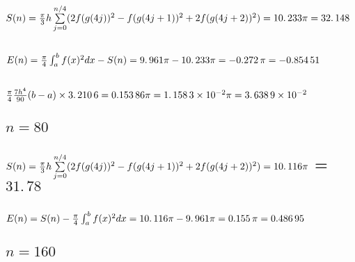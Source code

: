 \documentclass{article}
\begin{document}
\subsection{$S(n)=\frac{\protect\pi }{3}h\sum%
\limits_{j=0}^{n/4}(2f(g(4j))^{2}-f(g(4j+1))^{2}+2f(g(4j+2))^{2})=%
\allowbreak 10.\,\allowbreak 233\protect\pi =\allowbreak 32.\,\allowbreak
148 $}

\subsection{$E(n)=\frac{\protect\pi }{4}\protect\int_{a}^{b}f(x)^{2}dx-S(n)=%
\allowbreak 9.\,\allowbreak 961\protect\pi -10.\,\allowbreak 233\protect\pi %
=\allowbreak -0.272\,\protect\pi =\allowbreak -0.854\,51$}

\subsection{\protect\bigskip $\frac{\protect\pi }{4}\frac{7h^{4}}{90}%
(b-a)\times 3.\,\allowbreak 210\,6=\allowbreak 0.153\,86\protect\pi %
=\allowbreak 1.\,\allowbreak 158\,3\times 10^{-2}\protect\pi =\allowbreak
3.\,\allowbreak 638\,9\times 10^{-2}$}

\bigskip

\subsection{$n=80$}

\subsection{$S(n)=\frac{\protect\pi }{3}h\sum%
\limits_{j=0}^{n/4}(2f(g(4j))^{2}-f(g(4j+1))^{2}+2f(g(4j+2))^{2})=%
\allowbreak 10.\,\allowbreak 116\protect\pi $ = $31.\,\allowbreak 78$}

\subsection{$E(n)=S(n)-\frac{\protect\pi }{4}\protect\int_{a}^{b}f(x)^{2}dx=%
\allowbreak \allowbreak 10.\,\allowbreak 116\protect\pi -\allowbreak
9.\,\allowbreak 961\protect\pi =\allowbreak 0.155\,\protect\pi =\allowbreak
0.486\,95$}

\bigskip

\subsection{$n=160$}
\end{document}
